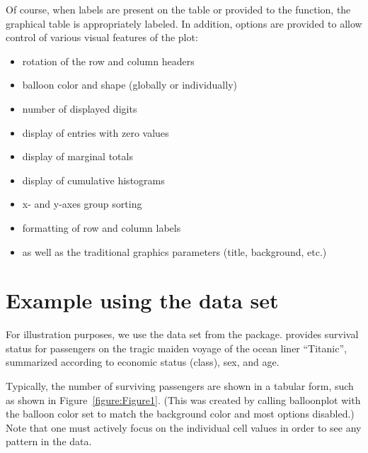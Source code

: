 \documentclass[a4paper]{report}
\begin{document}
\begin{article}
Of course, when labels are present on the table or provided to the
function, the graphical table is appropriately labeled.  In
addition, options are provided to allow control of various visual features
of the plot:

\begin{itemize}
  \item rotation of the row and column headers
  \item balloon color and shape (globally or individually)
  \item number of displayed digits
  \item display of entries with zero values
  \item display of marginal totals
  \item display of cumulative histograms
  \item x- and y-axes group sorting
  \item formatting of row and column labels
  \item as well as the traditional graphics parameters (title,
    background, etc.)
\end{itemize}

\section*{Example using the  data set}

For illustration purposes, we use the  data set from
the  package.   provides survival status
for passengers on the tragic maiden voyage of the ocean liner
``Titanic'', summarized according to economic status (class), sex, and
age.

Typically, the number of surviving passengers are shown in a tabular
form, such as shown in Figure~\ref{figure:Figure1}.  (This was created
by calling balloonplot with the balloon color set to match the
background color and most options disabled.)  Note that one must
actively focus on the individual cell values in order to see any
pattern in the data.


\end{article}
\end{document}
